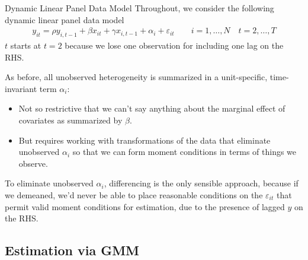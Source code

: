 \documentclass[aspectratio=169, handout]{beamer}
\begin{document}
{\footnotesize
\begin{frame}{Dynamic Linear Panel Data Model}
Throughout, we consider the following
\alert{dynamic linear panel data model}
\begin{align*}
  y_{it}
  =
  \rho y_{i,t-1}
  + \beta x_{it}
  + \gamma x_{i,t-1}
  + \alpha_i
  + \varepsilon_{it}
  \qquad
  i = 1,\ldots,N
  \quad
  t = 2,\ldots,T
\end{align*}
$t$ starts at $t=2$ because we lose one observation
for including one lag on the RHS.

As before, all unobserved heterogeneity is summarized in a
unit-specific, time-invariant term $\alpha_i$:
\begin{itemize}
  \item Not so restrictive that we can't say anything about the marginal
    effect of covariates as summarized by $\beta$.
  \item But requires working with transformations of the data that
    eliminate \alert{unobserved} $\alpha_i$ so that we can form moment
    conditions in terms of things we \alert{observe}.
\end{itemize}
To eliminate unobserved $\alpha_i$, \alert{differencing} is the only
sensible approach, because if we demeaned, we'd never be able to place
reasonable conditions on the $\varepsilon_{it}$ that permit valid moment
conditions for estimation, due to the presence of lagged $y$ on the RHS.
\end{frame}
}


\subsection{Estimation via GMM}
\end{document}
